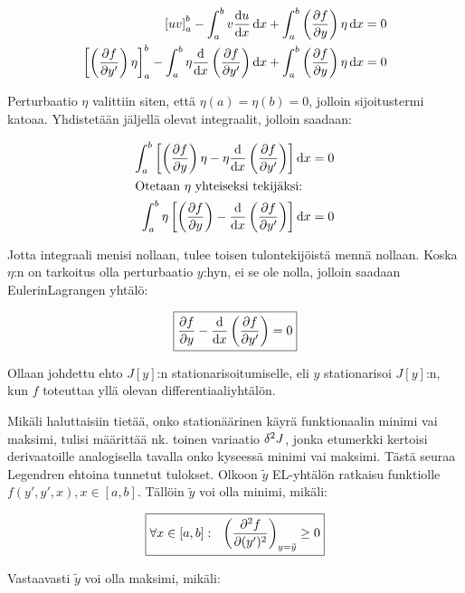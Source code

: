 \documentclass[../johdoksia.tex]{subfiles}
\begin{document}
	\begin{align*}
		\left[uv\right]_{a}^{b} - \int_{a}^{b}v\odv{u}{x}\odif{x} + \int_{a}^{b}\left(\pdv{f}{y}\right)\eta\odif{x} &= 0 \\
		\left[\left(\pdv{f}{y'}\right)\eta\right]_{a}^{b} - \int_{a}^{b}\eta\odv{}{x}\left(\pdv{f}{y'}\right)\odif{x} + \int_{a}^{b}\left(\pdv{f}{y}\right)\eta\odif{x} &= 0
	\end{align*}

	Perturbaatio $\eta$ valittiin siten, että $\eta(a) = \eta(b) = 0$, jolloin sijoitustermi katoaa. Yhdistetään jäljellä olevat integraalit, jolloin saadaan:
	
	\begin{align*}
		\int_{a}^{b}\left[\left(\pdv{f}{y}\right)\eta - \eta\odv{}{x}\left(\pdv{f}{y'}\right)\right]\odif{x} &= 0 \\
		\intertext{Otetaan $\eta$ yhteiseksi tekijäksi:}
		\int_{a}^{b}\eta\left[\left(\pdv{f}{y}\right) - \odv{}{x}\left(\pdv{f}{y'}\right)\right]\odif{x} &= 0 \\
	\end{align*}

	Jotta integraali menisi nollaan, tulee toisen tulontekijöistä mennä nollaan. Koska $\eta$:n on tarkoitus olla perturbaatio $y$:hyn, ei se ole nolla, jolloin saadaan Eulerin\textendash Lagrangen yhtälö:
	
	\begin{equation}
		\boxed{\pdv{f}{y} - \odv{}{x}\left(\pdv{f}{y'}\right) = 0}
	\end{equation}
	
	Ollaan johdettu ehto $J[y]$:n stationarisoitumiselle, eli $y$ stationarisoi $J[y]$:n, kun $f$ toteuttaa yllä olevan differentiaaliyhtälön.
	
	Mikäli haluttaisiin tietää, onko stationäärinen käyrä funktionaalin minimi vai maksimi, tulisi määrittää nk. toinen variaatio $\fdif{^2J}$, jonka etumerkki kertoisi derivaatoille analogisella tavalla onko kyseessä minimi vai maksimi. Tästä seuraa Legendren ehtoina tunnetut tulokset. Olkoon $\tilde{y}$ EL-yhtälön ratkaisu funktiolle $f(y', y', x), x\in[a,b]$. Tällöin $\tilde{y}$ voi olla minimi, mikäli:
	
	\begin{equation}
		\boxed{\forall x \in[a,b]: \ \ \left(\pdv{^2f}{(y')^2}\right)_{y=\tilde{y}} \geq 0}
	\end{equation} 

	Vastaavasti $\tilde{y}$ voi olla maksimi, mikäli:
	
\end{document}
